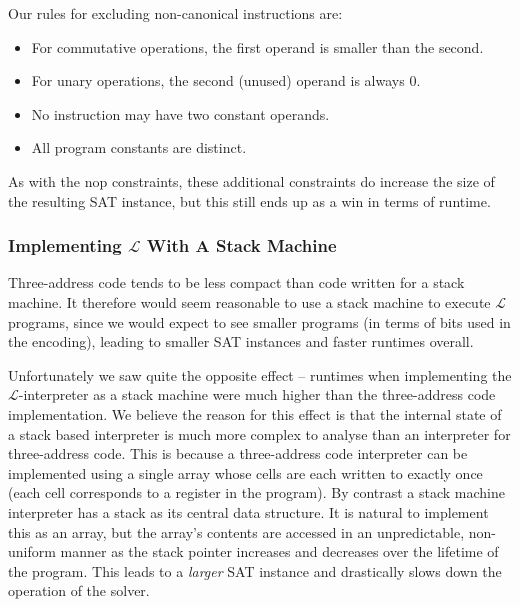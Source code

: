 \documentclass[a4paper]{llncs}
\begin{document}
Our rules for excluding non-canonical instructions are:

\begin{itemize}
 \item For commutative operations, the first operand is smaller than the second.
 \item For unary operations, the second (unused) operand is always 0.
 \item No instruction may have two constant operands.
 \item All program constants are distinct.
\end{itemize}

As with the nop constraints, these additional constraints do increase the
size of the resulting SAT instance, but this still ends up as a win in
terms of runtime.

\subsubsection{Implementing $\mathcal{L}$ With A Stack Machine}
Three-address code tends to be less compact than code written for a stack
machine.  It therefore would seem reasonable to use a stack machine to
execute $\mathcal{L}$ programs, since we would expect to see smaller programs
(in terms of bits used in the encoding), leading to smaller SAT instances
and faster runtimes overall.

Unfortunately we saw quite the opposite effect -- runtimes when implementing the
$\mathcal{L}$-interpreter as a stack machine were much higher than the three-address
code implementation.  We believe the reason for this
effect is that the internal state of a stack based interpreter is much more complex
to analyse than an interpreter for three-address code.  This is because a
three-address code interpreter can be implemented using a single array whose cells are
each written to exactly once (each cell corresponds to a register in the program).
By contrast a stack machine interpreter has a stack as its central data structure.
It is natural to implement this as an array, but the array's contents are accessed
in an unpredictable, non-uniform manner as the stack pointer increases and decreases
over the lifetime of the program.  This leads to a \emph{larger} SAT
instance and drastically slows down the operation of the solver.
\end{document}

